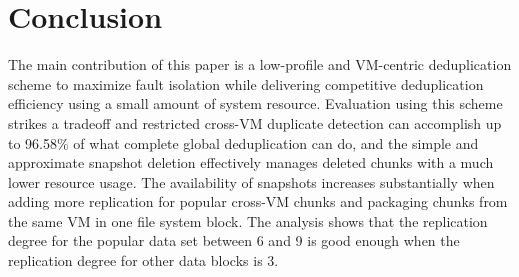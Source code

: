 \section{Conclusion}
\label{sect:conclusion}
The main contribution of this paper is a low-profile and VM-centric deduplication scheme to 
maximize fault isolation while delivering competitive deduplication efficiency using
a small amount of system resource.
Evaluation using  this scheme strikes a tradeoff and restricted cross-VM duplicate detection
can accomplish up to 96.58\% of what complete global
deduplication can do, and the simple and approximate snapshot deletion 
effectively manages deleted chunks with a 
much lower resource usage.  The availability of snapshots increases substantially when
adding more replication for popular cross-VM chunks and packaging chunks from the same 
VM in one file system block. The analysis shows that the replication degree
for the popular data set between 6 and 9 is good enough when the replication degree
for other data blocks is 3.


